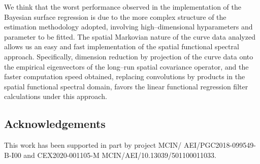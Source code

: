 \documentclass[11pt,a4paper]{article}
\begin{document}
We think that the   worst performance observed in the implementation of  the Bayesian surface regression  is  due to the more complex structure of the estimation methodology adopted, involving high--dimensional hyparameters and parameter to be fitted.   The spatial Markovian nature   of the curve data  analyzed allows us an easy and fast  implementation of the spatial functional spectral approach. Specifically,  dimension  reduction by projection of the  curve data onto the empirical eigenvectors of the long--run
spatial covariance operator, and the faster computation speed  obtained,  replacing  convolutions  by products in the spatial functional spectral domain, favors  the linear  functional regression filter calculations under this approach.


\subsection*{Acknowledgements}
This work has been supported in part by project  MCIN/ AEI/PGC2018-099549-B-I00  and CEX2020-001105-M MCIN/AEI/10.13039/501100011033.
\end{document}
